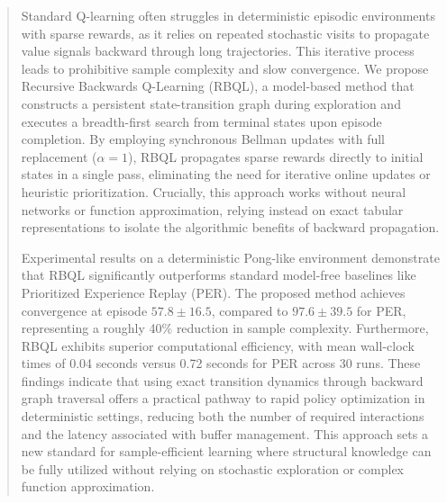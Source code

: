 \documentclass[manuscript, screen, review]{jair}
\begin{document}
\begin{abstract}
Standard Q-learning often struggles in deterministic episodic environments with sparse rewards, as it relies on repeated stochastic visits to propagate value signals backward through long trajectories. This iterative process leads to prohibitive sample complexity and slow convergence. We propose Recursive Backwards Q-Learning (RBQL), a model-based method that constructs a persistent state-transition graph during exploration and executes a breadth-first search from terminal states upon episode completion. By employing synchronous Bellman updates with full replacement ($\alpha=1$), RBQL propagates sparse rewards directly to initial states in a single pass, eliminating the need for iterative online updates or heuristic prioritization. Crucially, this approach works without neural networks or function approximation, relying instead on exact tabular representations to isolate the algorithmic benefits of backward propagation.

Experimental results on a deterministic Pong-like environment demonstrate that RBQL significantly outperforms standard model-free baselines like Prioritized Experience Replay (PER). The proposed method achieves convergence at episode $57.8 \pm 16.5$, compared to $97.6 \pm 39.5$ for PER, representing a roughly 40\% reduction in sample complexity. Furthermore, RBQL exhibits superior computational efficiency, with mean wall-clock times of 0.04 seconds versus 0.72 seconds for PER across 30 runs. These findings indicate that using exact transition dynamics through backward graph traversal offers a practical pathway to rapid policy optimization in deterministic settings, reducing both the number of required interactions and the latency associated with buffer management. This approach sets a new standard for sample-efficient learning where structural knowledge can be fully utilized without relying on stochastic exploration or complex function approximation.
\end{abstract}



\maketitle
\end{document}
